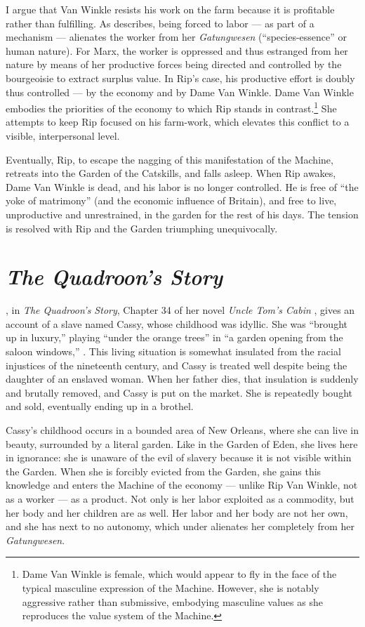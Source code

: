 \documentclass[man,12pt,natbib]{apa6}
\begin{document}
I argue that Van Winkle resists his work on the farm because it is profitable
rather than fulfilling.  As \citet{Marx44} describes, being forced to labor ---
as part of a mechanism --- alienates the worker from her \emph{Gatungwesen}
(``species-essence'' or human nature).  For Marx, the worker is oppressed and
thus estranged from her nature by means of her productive forces being directed
and controlled by the bourgeoisie to extract surplus value. In Rip's case, his
productive effort is doubly thus controlled --- by the economy and by Dame Van
Winkle.  Dame Van Winkle embodies the priorities of the economy to which Rip
stands in contrast.\footnote{Dame Van Winkle is female, which would appear to
fly in the face of the typical masculine expression of the Machine.  However,
she is notably aggressive rather than submissive, embodying masculine values as
she reproduces the value system of the Machine.} She attempts to keep Rip
focused on his farm-work, which elevates this conflict to a visible,
interpersonal level.

Eventually, Rip, to escape the nagging of this manifestation of the Machine,
retreats into the Garden of the Catskills, and falls asleep. When Rip awakes,
Dame Van Winkle is dead, and his labor is no longer controlled. He is free of
``the yoke of matrimony'' (and the economic influence of Britain), and free to
live, unproductive and unrestrained, in the garden for the rest of his days.
The tension is resolved with Rip and the Garden triumphing unequivocally.

\section{\emph{The Quadroon's Story}}

\citet{Stowe12}, in \emph{The Quadroon's Story}, Chapter 34 of her novel
\emph{Uncle Tom's Cabin} \citep{Stowe52}, gives an account of a slave named
Cassy, whose childhood was idyllic. She was  ``brought up in luxury,'' playing
``under the orange trees'' in ``a garden opening from the saloon windows,''
\citep[p.~895]{Stowe12}. This living situation is somewhat insulated from the
racial injustices of the nineteenth century, and Cassy is treated well despite
being the daughter of an enslaved woman. When her father dies, that insulation
is suddenly and brutally removed, and Cassy is put on the market. She is
repeatedly bought and sold, eventually ending up in a brothel.

Cassy's childhood occurs in a bounded area of New Orleans, where she can live
in beauty, surrounded by a literal garden. Like in the Garden of Eden, she
lives here in ignorance: she is unaware of the evil of slavery because it is
not visible within the Garden. When she is forcibly evicted from the Garden,
she gains this knowledge and enters the Machine of the economy --- unlike Rip
Van Winkle, not as a worker --- as a product. Not only is her labor exploited
as a commodity, but her body and her children are as well. Her labor and her
body are not her own, and she has next to no autonomy, which under
\citet{Marx44} alienates her completely from her \emph{Gatungwesen}.
\end{document}
